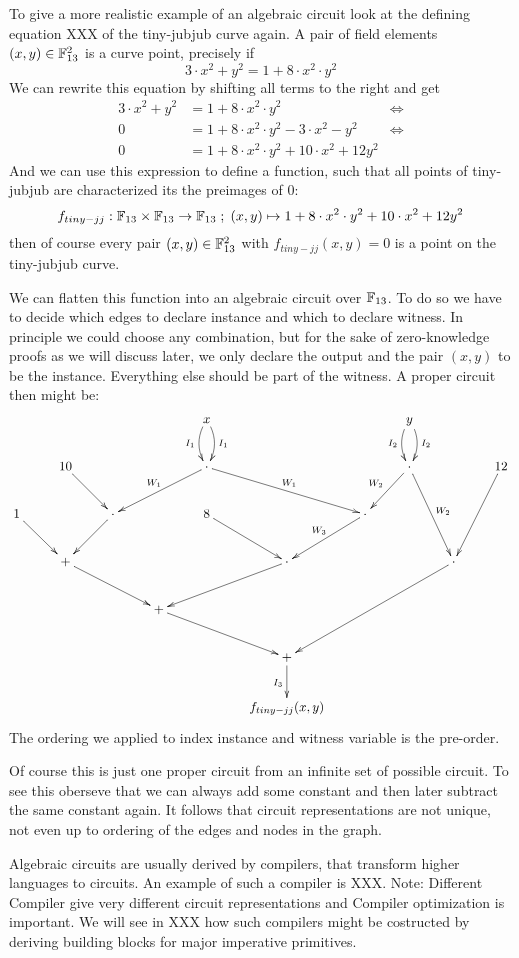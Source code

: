 \begin{example} To give a more realistic example of an algebraic circuit look at the defining equation XXX of the tiny-jubjub curve again. A pair of field elements 
$(x,y)\in \mathbb{F}_{13}^2$ is a curve point, precisely if
$$
3\cdot x^2 + y^2 = 1+ 8\cdot x^2\cdot y^2
$$  
We can rewrite this equation by shifting all terms to the right and get
\begin{align*}
3\cdot x^2 + y^2 & = 1+ 8\cdot x^2\cdot y^2 & \Leftrightarrow\\
0 & = 1+ 8\cdot x^2\cdot y^2 - 3\cdot x^2 - y^2 & \Leftrightarrow\\
0 & = 1+ 8\cdot x^2\cdot y^2 + 10\cdot x^2 +12 y^2
\end{align*}
And we can use this expression to define a function, such that all points of tiny-jubjub are characterized its the preimages of $0$:
$$
f_{tiny-jj}: \mathbb{F}_{13}\times \mathbb{F}_{13}\to \mathbb{F}_{13}\; ; \;
(x,y)\mapsto 1+ 8\cdot x^2\cdot y^2 + 10\cdot x^2 +12 y^2
$$
then of course every pair $(x,y)\in \mathbb{F}_{13}^2$ with $f_{tiny-jj}(x,y)=0$ is a point on the tiny-jubjub curve.

We can flatten this function into an algebraic circuit over $\mathbb{F}_{13}$. To do so we have to decide which edges to declare instance and which to declare witness. In principle we could choose any combination, but for the sake of zero-knowledge proofs as we will discuss later, we only declare the output and the pair $(x,y)$ to be the instance. Everything else should be part of the witness. A proper circuit then might be:
\begingroup
    \fontsize{8pt}{10pt}\selectfont
\[
\xymatrix{
 & &  & &
x\ar^{I_1}@/^/[d]\ar_{I_1}@/_/[d]  &  & & 
y\ar^{I_2}@/^/[d]\ar_{I_2}@/_/[d]\\
 & 10 \ar[dr]& & &
\cdot \ar^{W_1}[drr] \ar_{W_1}[dll]&  & &
\cdot \ar_{W_2}[dl] \ar^{W_2}[ddr] &  &
12 \ar[ddl] \\
1 \ar[dr] & &  
 \cdot \ar[dl] & & 
 8 \ar[dr] & &
 \cdot \ar_{W_3}[dl] & & 
 \\
 & 
 + \ar[drr] & & & &
 \cdot \ar[dll] & & &
 \cdot \ar[ddlll]\\
 & & & 
 + \ar[drr]& & & 
 \\
 & & & & & 
 + \ar_{I_3}[d]\\
 & & & & & 
 f_{tiny-jj}(x,y)
}
\]
\endgroup
The ordering we applied to index instance and witness variable is the pre-order. 

Of course this is just one proper circuit from an infinite set of possible circuit. To see this oberseve that we can always add some constant and then later subtract the same constant again. It follows that circuit representations are not unique, not even up to ordering of the edges and nodes in the graph.
\end{example}
Algebraic circuits are usually derived by compilers, that transform  higher languages to circuits. An example of such a compiler is XXX. Note: Different Compiler give very different circuit representations and Compiler optimization is important. We will see in XXX how such compilers might be costructed by deriving building blocks for major imperative primitives.
